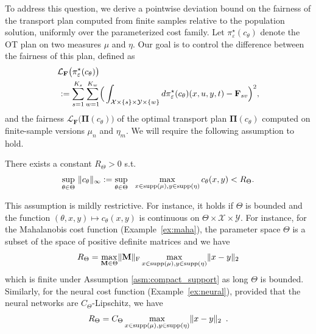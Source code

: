 \documentclass{article}
\DeclarePairedDelimiter\norm{\lVert}{\rVert}%
\theoremstyle{definition}
\newcommand{\calX}{\mathcal{X}}
\newcommand{\calY}{\mathcal{Y}}
\begin{document}
To address this question, we derive a pointwise deviation bound on the fairness of the transport plan computed from finite samples relative to the population solution, uniformly over the parameterized cost family. Let $\pi_\varepsilon^\star(c_\theta)$ denote the OT plan on two measures $\mu$ and $\eta$. Our goal is to control the difference between the fairness of this plan, defined as
\begin{align*}
    \mathcal{L}_\mathbf{F}\big(\pi_\varepsilon^\star(c_\theta)\big)& \\
    \hspace{-10em}:= \sum\limits_{s=1}^{K_s}\sum\limits_{w=1}^{K_w}&\Big(\int_{\mathcal{X}\times\lbrace s\rbrace\times\mathcal{Y}\times \lbrace w\rbrace}d\pi_\varepsilon^\star(c_\theta)(x,u,y,t) - \mathbf{F}_{sv}\Big)^2,
\end{align*}
and the fairness $\mathcal{L}_\mathbf{F}\big(\mathbf{\Pi}(c_\theta)\big)$ of the optimal transport plan $\mathbf{\Pi}(c_\theta)$ computed on finite-sample versions $\mu_n$ and $\eta_m$. We will require the following assumption to hold.
\begin{boxasm}
\label{asm:bounded_cost}
    There exists a constant $R_\Theta > 0$ s.t.
    \begin{align*}
        \sup\limits_{\theta \in \Theta }\,\, \norm{c_\theta}_\infty :=\sup\limits_{\theta \in \Theta } ~~ \max\limits_{x \in \textnormal{supp}(\mu),y \in \textnormal{supp}(\eta)} c_\theta(x,y)  < R_\Theta.
    \end{align*}
\end{boxasm}
This assumption is mildly restrictive. For instance, it holds if $\Theta$ is bounded and the function $(\theta,x,y)\mapsto c_\theta(x, y)$ is continuous on $\Theta\times\calX\times\calY$. For instance, for the Mahalanobis cost function (Example~\ref{ex:maha}), the parameter space $\Theta$ is a subset of the space of positive definite matrices and we have 
\begin{align*}
    R_\Theta = \max\limits_{\mathbf{M} \in \Theta}\norm{\mathbf{M}}_\textnormal{F} \max\limits_{x \in \textnormal{supp}(\mu), y \in \textnormal{supp}(\eta)} \norm{x-y}_2
\end{align*}
which is finite under Assumption \ref{asm:compact_support} as long $\Theta$ is bounded. Similarly, for the neural cost function (Example~\ref{ex:neural}), provided that the neural networks are $C_\Theta$-Lipschitz, we have 
\begin{align*}
    R_\Theta = C_\Theta \max\limits_{x \in \textnormal{supp}(\mu), y \in \textnormal{supp}(\eta)} \norm{x-y}_2\enspace.
\end{align*}
\end{document}
